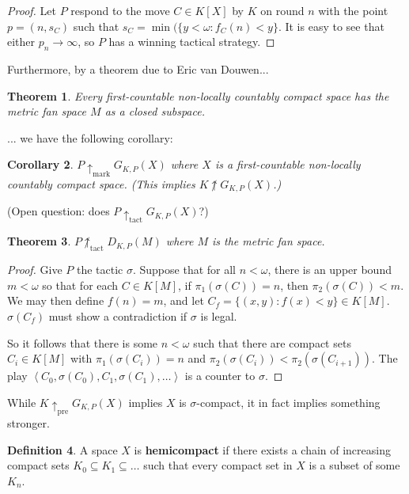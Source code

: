 \documentclass[11pt]{article}
\theoremstyle{plain}
\newtheorem{theorem}{Theorem}
\newtheorem{corollary}[theorem]{Corollary}
\theoremstyle{definition}
\newtheorem{definition}[theorem]{Definition}
\theoremstyle{remark}
\newcommand{\prewin}{\uparrow_{\text{pre}}}
\newcommand{\markwin}{\uparrow_{\text{mark}}}
\newcommand{\tactwin}{\uparrow_{\text{tact}}}
\begin{document}
\begin{proof}
Let $P$ respond to the move $C\in K[X]$ by $K$ on round $n$ with the point $p=(n,s_C)$ such that $s_C = \min(\{y<\omega : f_C(n) < y\}$. It is easy to see that either $p_n\rightarrow \infty$, so $P$ has a winning tactical strategy.
\end{proof}

Furthermore, by a theorem due to Eric van Douwen...

\begin{theorem}
Every first-countable non-locally countably compact space has the metric fan space $M$ as a closed subspace.
\end{theorem}

... we have the following corollary:

\begin{corollary}
$P \markwin G_{K,P}(X)$ where $X$ is a first-countable non-locally countably compact space. (This implies $K\not\uparrow G_{K,P}(X)$.)
\end{corollary}

(Open question: does $P \tactwin G_{K,P}(X)$?)

\begin{theorem}
$P \not\tactwin D_{K,P}(M)$ where $M$ is the metric fan space.
\end{theorem}

\begin{proof}
Give $P$ the tactic $\sigma$. Suppose that for all $n<\omega$, there is an upper bound $m<\omega$ so that for each $C \in K[M]$, if $\pi_1(\sigma(C))=n$, then $\pi_2(\sigma(C))<m$. We may then define $f(n)=m$, and let $C_f=\{(x,y):f(x)<y\}\in K[M]$. $\sigma(C_f)$ must show a contradiction if $\sigma$ is legal.

So it follows that there is some $n<\omega$ such that there are compact sets $C_i\in K[M]$ with $\pi_1(\sigma(C_i))=n$ and $\pi_2(\sigma(C_i))<\pi_2(\sigma(C_{i+1}))$. The play $\left<C_0,\sigma(C_0),C_1,\sigma(C_1),\dots\right>$ is a counter to $\sigma$.
\end{proof}

While $K\prewin G_{K,P}(X)$ implies $X$ is $\sigma$-compact, it in fact implies something stronger.

\begin{definition}
A space $X$ is \textbf{hemicompact} if there exists a chain of increasing compact sets $K_0\subseteq K_1 \subseteq \dots$ such that every compact set in $X$ is a subset of some $K_n$.
\end{definition}
\end{document}
